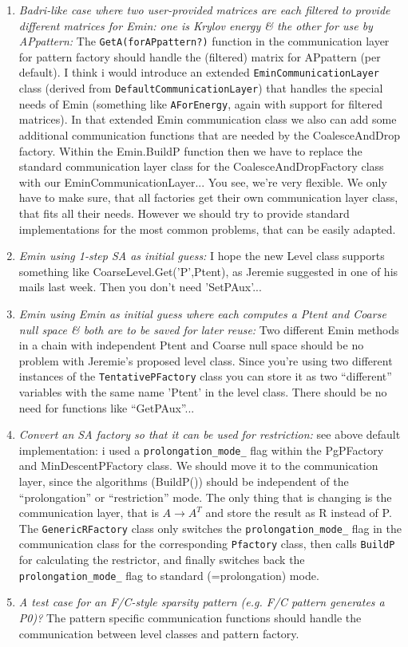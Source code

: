 \begin{enumerate}
\item \textit{Badri-like case where two user-provided matrices are each filtered to provide different matrices for Emin: one is Krylov energy \& the other for use by APpattern:} The \verb|GetA(forAPpattern?)| function in the communication layer for pattern factory should handle the (filtered) matrix for APpattern (per default). I think i would introduce an extended \verb|EminCommunicationLayer| class (derived from \verb|DefaultCommunicationLayer|) that handles the special needs of Emin (something like \verb|AForEnergy|, again with support for filtered matrices). In that extended Emin communication class we also can add some additional communication functions that are needed by the CoalesceAndDrop factory. Within the Emin.BuildP function then we have to replace the standard communication layer class for the CoalesceAndDropFactory class with our EminCommunicationLayer... You see, we're very flexible. We only have to make sure, that all factories get their own communication layer class, that fits all their needs. However we should try to provide standard implementations for the most common problems, that can be easily adapted.
\item \textit{Emin using 1-step SA as initial guess:} I hope the new Level class supports something like CoarseLevel.Get('P',Ptent), as Jeremie suggested in one of his mails last week. Then you don't need 'SetPAux'...
\item \textit{Emin using Emin as initial guess where each computes a Ptent and Coarse null space \& both are to be saved for later reuse:} Two different Emin methods in a chain with independent Ptent and Coarse null space should be no problem with Jeremie's proposed level class. Since you're using two different instances of the \verb|TentativePFactory| class you can store it as two ``different'' variables with the same name 'Ptent' in the level class. There should be no need for functions like ``GetPAux''...
\item \textit{Convert an SA factory so that it can be used for restriction:} see above default implementation: i used a \verb|prolongation_mode_| flag within the PgPFactory and MinDescentPFactory class. We should move it to the communication layer, since the algorithms (BuildP()) should be independent of the ``prolongation'' or ``restriction'' mode. The only thing that is changing is the communication layer, that is $A \rightarrow A^T$ and store the result as R instead of P. The \verb|GenericRFactory| class only switches the \verb|prolongation_mode_| flag in the communication class for the corresponding \verb|Pfactory| class, then calls \verb|BuildP| for calculating the restrictor, and finally switches back the \verb|prolongation_mode_| flag to standard (=prolongation) mode.
\item \textit{A test case for an F/C-style sparsity pattern (e.g. F/C pattern generates a P0)?} The pattern specific communication functions should handle the communication between level classes and pattern factory.
\end{enumerate}
